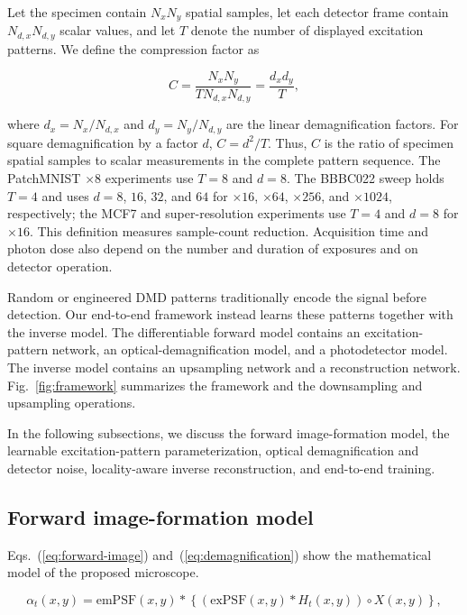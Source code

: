 \documentclass{optica-article}
\begin{document}
Let the specimen contain $N_xN_y$ spatial samples, let each detector frame contain $N_{d,x}N_{d,y}$ scalar values, and let $T$ denote the number of displayed excitation patterns. We define the compression factor as

\begin{equation}
    C = \frac{N_xN_y}{T N_{d,x}N_{d,y}}
      = \frac{d_xd_y}{T},
    \label{eq:compression}
\end{equation}

where $d_x=N_x/N_{d,x}$ and $d_y=N_y/N_{d,y}$ are the linear demagnification factors. For square demagnification by a factor $d$, $C=d^2/T$. Thus, $C$ is the ratio of specimen spatial samples to scalar measurements in the complete pattern sequence. The PatchMNIST $\times8$ experiments use $T=8$ and $d=8$. The BBBC022 sweep holds $T=4$ and uses $d=8$, $16$, $32$, and $64$ for $\times16$, $\times64$, $\times256$, and $\times1024$, respectively; the MCF7 and super-resolution experiments use $T=4$ and $d=8$ for $\times16$. This definition measures sample-count reduction. Acquisition time and photon dose also depend on the number and duration of exposures and on detector operation.

Random or engineered DMD patterns traditionally encode the signal before detection. Our end-to-end framework instead learns these patterns together with the inverse model. The differentiable forward model contains an excitation-pattern network, an optical-demagnification model, and a photodetector model. The inverse model contains an upsampling network and a reconstruction network. Fig.~\ref{fig:framework} summarizes the framework and the downsampling and upsampling operations.

In the following subsections, we discuss the forward image-formation model, the learnable excitation-pattern parameterization, optical demagnification and detector noise, locality-aware inverse reconstruction, and end-to-end training.

\subsection{Forward image-formation model}

Eqs.~(\ref{eq:forward-image}) and~(\ref{eq:demagnification}) show the mathematical model of the proposed microscope.

\begin{equation}
\alpha_t(x,y) = \mathrm{emPSF}(x,y) *
\left\{
\left(
\mathrm{exPSF}(x,y) * H_t(x,y)
\right)
\circ X(x,y)
\right\},
\label{eq:forward-image}
\end{equation}
\end{document}
